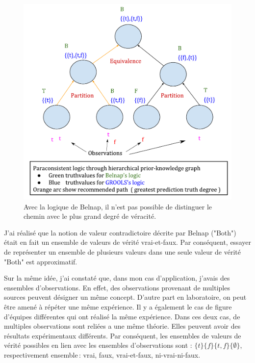 \begin{refsegment}
\begin{shadedfigure}[H]
\begin{subfigure}[t]{.48\textwidth}
		\includegraphics[width=\textwidth]{img/GROOLS_vs_belnap_2.pdf}
		\caption{Avec la logique de Belnap, il n'est pas possible de distinguer le chemin avec le plus grand degré de véracité. }
		\label{fig:grools_belnap_2}
	\end{subfigure}
	\label{fig:grools_belnap}
\end{shadedfigure}

J'ai réalisé que la notion de valeur contradictoire décrite par Belnap ("Both") était en fait un ensemble de valeurs de vérité vrai-et-faux. Par conséquent, essayer de représenter un ensemble de plusieurs valeurs dans une seule valeur de vérité "Both" est approximatif.

Sur la même idée, j'ai constaté que, dans mon cas d'application, j'avais des ensembles d'observations. En effet, des observations provenant de multiples sources peuvent désigner un même concept. D'autre part en laboratoire, on peut être amené à répéter une même expérience. Il y a également le cas de figure d'équipes différentes qui ont réalisé la même expérience. Dans ces deux cas, de multiples observations sont reliées a une même théorie. Elles peuvent avoir des résultats expérimentaux différents. Par conséquent, les ensembles de valeurs de vérité possibles en lien avec les ensembles d'observations sont : $\{t\} \{f\} \{t,f\} \{\emptyset\}$, respectivement ensemble : vrai, faux, vrai-et-faux, ni-vrai-ni-faux. 


\end{refsegment}
